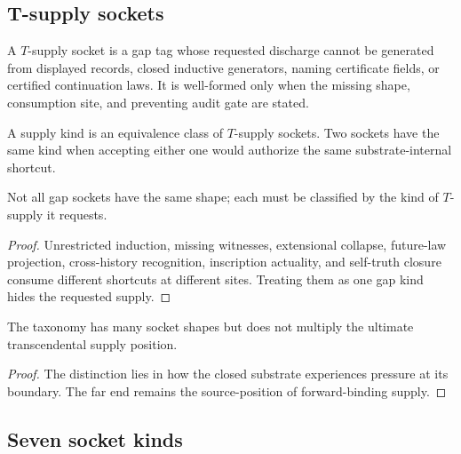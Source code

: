 \subsection{T-supply sockets}
\label{subsec:philosophy-t-supply-sockets}

\begin{definition}
\label{def:philosophy-t-supply-socket}
A \(T\)-supply socket is a gap tag whose requested discharge cannot be
generated from displayed records, closed inductive generators, naming
certificate fields, or certified continuation laws. It is well-formed
only when the missing shape, consumption site, and preventing audit
gate are stated.
\end{definition}

\begin{definition}
\label{def:philosophy-supply-kind}
A supply kind is an equivalence class of \(T\)-supply sockets. Two
sockets have the same kind when accepting either one would authorize
the same substrate-internal shortcut.
\end{definition}

\begin{theorem}
\label{thm:philosophy-gap-sockets-classified}
Not all gap sockets have the same shape; each must be classified by
the kind of \(T\)-supply it requests.
\end{theorem}
\begin{proof}
Unrestricted induction, missing witnesses, extensional collapse,
future-law projection, cross-history recognition, inscription
actuality, and self-truth closure consume different shortcuts at
different sites. Treating them as one gap kind hides the requested
supply.
\end{proof}

\begin{corollary}
\label{cor:philosophy-many-sockets-one-far-end}
The taxonomy has many socket shapes but does not multiply the ultimate
transcendental supply position.
\end{corollary}
\begin{proof}
The distinction lies in how the closed substrate experiences pressure
at its boundary. The far end remains the source-position of
forward-binding supply.
\end{proof}

\subsection{Seven socket kinds}
\label{subsec:philosophy-seven-socket-kinds}

